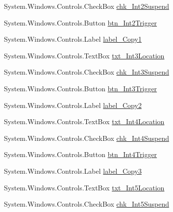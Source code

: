 \begin{DoxyCompactItemize}
\item 
System.\+Windows.\+Controls.\+Check\+Box \hyperlink{class_c_p_u___o_s___simulator_1_1_interrupts_window_adfdd177cb50be62b5e3ded2b9a5695ba}{chk\+\_\+\+Int2\+Suspend}
\item 
System.\+Windows.\+Controls.\+Button \hyperlink{class_c_p_u___o_s___simulator_1_1_interrupts_window_a712728d9db84caf19171bb4390f2cfb0}{btn\+\_\+\+Int2\+Trigger}
\item 
System.\+Windows.\+Controls.\+Label \hyperlink{class_c_p_u___o_s___simulator_1_1_interrupts_window_a5c7310142cbca51206c94af5b9cbc9a4}{label\+\_\+\+Copy1}
\item 
System.\+Windows.\+Controls.\+Text\+Box \hyperlink{class_c_p_u___o_s___simulator_1_1_interrupts_window_a8ee7798219efa17571dcb328c1898b73}{txt\+\_\+\+Int3\+Location}
\item 
System.\+Windows.\+Controls.\+Check\+Box \hyperlink{class_c_p_u___o_s___simulator_1_1_interrupts_window_a450179d96920f046799339d560c8957d}{chk\+\_\+\+Int3\+Suspend}
\item 
System.\+Windows.\+Controls.\+Button \hyperlink{class_c_p_u___o_s___simulator_1_1_interrupts_window_ab697388b33fac73a4044fd6a3877e286}{btn\+\_\+\+Int3\+Trigger}
\item 
System.\+Windows.\+Controls.\+Label \hyperlink{class_c_p_u___o_s___simulator_1_1_interrupts_window_aa7777594076186224c2fb09f79b9de41}{label\+\_\+\+Copy2}
\item 
System.\+Windows.\+Controls.\+Text\+Box \hyperlink{class_c_p_u___o_s___simulator_1_1_interrupts_window_a0bd0d35e17b19253155a4f2aaaff6854}{txt\+\_\+\+Int4\+Location}
\item 
System.\+Windows.\+Controls.\+Check\+Box \hyperlink{class_c_p_u___o_s___simulator_1_1_interrupts_window_ab3be1f419d4189dcfc917587e87edc73}{chk\+\_\+\+Int4\+Suspend}
\item 
System.\+Windows.\+Controls.\+Button \hyperlink{class_c_p_u___o_s___simulator_1_1_interrupts_window_a0ecf962593ac6557beb80a523417a1b5}{btn\+\_\+\+Int4\+Trigger}
\item 
System.\+Windows.\+Controls.\+Label \hyperlink{class_c_p_u___o_s___simulator_1_1_interrupts_window_a6416ce1254faed5ac9fa78bee888a954}{label\+\_\+\+Copy3}
\item 
System.\+Windows.\+Controls.\+Text\+Box \hyperlink{class_c_p_u___o_s___simulator_1_1_interrupts_window_ae9d0fab6452d4b38986eedcb787e2fbd}{txt\+\_\+\+Int5\+Location}
\item 
System.\+Windows.\+Controls.\+Check\+Box \hyperlink{class_c_p_u___o_s___simulator_1_1_interrupts_window_a8e7a5502f967a939c161b4b614375dec}{chk\+\_\+\+Int5\+Suspend}

\end{DoxyCompactItemize}
